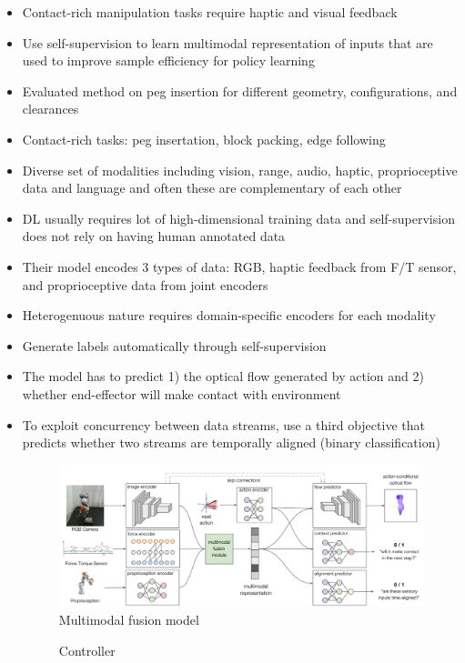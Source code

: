 \begin{itemize}
  \item Contact-rich manipulation tasks require haptic and visual feedback
  \item Use self-supervision to learn multimodal representation of inputs that are used to improve sample efficiency for policy learning
  \item Evaluated method on peg insertion for different geometry, configurations, and clearances
  \item Contact-rich tasks: peg insertation, block packing, edge following
  \item Diverse set of modalities including vision, range, audio, haptic, proprioceptive data and language and often these are complementary of each other
  \item DL usually requires lot of high-dimensional training data and self-supervision does not rely on having human annotated data
  \item Their model encodes 3 types of data: RGB, haptic feedback from F/T sensor, and proprioceptive data from joint encoders
  \item Heterogenuous nature requires domain-specific encoders for each modality
  \item Generate labels automatically through self-supervision
  \item The model has to predict 1) the optical flow generated by action and 2) whether end-effector will make contact with environment
  \item To exploit concurrency between data streams, use a third objective that predicts whether two streams are temporally aligned (binary classification)
  \begin{figure}[H]
    \caption{Multimodal fusion model}
    \centering
    \includegraphics[width=\textwidth]{../../imgs/multimodal_contact_tasks.png}
  \end{figure}
  \begin{figure}[H]
    \caption{Controller}
    \centering

\end{figure}
\end{itemize}
